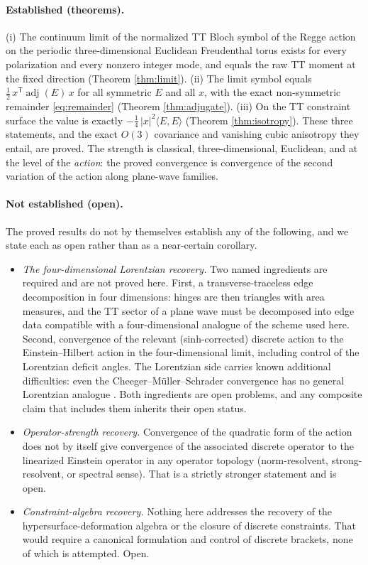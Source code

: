 \documentclass[11pt]{article}
\theoremstyle{definition}
\theoremstyle{remark}
\DeclareMathOperator{\adjE}{adj}
\newcommand{\trans}{\mathsf{T}}
\begin{document}
\paragraph{Established (theorems).}
(i) The continuum limit of the normalized TT Bloch symbol of the Regge action on the periodic three-dimensional Euclidean Freudenthal torus exists for every polarization and every nonzero integer mode, and equals the raw TT moment at the fixed direction (Theorem \ref{thm:limit}). (ii) The limit symbol equals $\tfrac12\,x^{\trans}\adjE(E)\,x$ for all symmetric $E$ and all $x$, with the exact non-symmetric remainder \eqref{eq:remainder} (Theorem \ref{thm:adjugate}). (iii) On the TT constraint surface the value is exactly $-\tfrac14\,|x|^2\langle E,E\rangle$ (Theorem \ref{thm:isotropy}). These three statements, and the exact $O(3)$ covariance and vanishing cubic anisotropy they entail, are proved. The strength is classical, three-dimensional, Euclidean, and at the level of the \emph{action}: the proved convergence is convergence of the second variation of the action along plane-wave families.

\paragraph{Not established (open).}
The proved results do not by themselves establish any of the following, and we state each as open rather than as a near-certain corollary.
\begin{itemize}
\item \emph{The four-dimensional Lorentzian recovery.} Two named ingredients are required and are not proved here. First, a transverse-traceless edge decomposition in four dimensions: hinges are then triangles with area measures, and the TT sector of a plane wave must be decomposed into edge data compatible with a four-dimensional analogue of the scheme used here. Second, convergence of the relevant (sinh-corrected) discrete action to the Einstein--Hilbert action in the four-dimensional limit, including control of the Lorentzian deficit angles. The Lorentzian side carries known additional difficulties: even the Cheeger--M\"uller--Schrader convergence has no general Lorentzian analogue \cite{CMS, Brewin}. Both ingredients are open problems, and any composite claim that includes them inherits their open status.
\item \emph{Operator-strength recovery.} Convergence of the quadratic form of the action does not by itself give convergence of the associated discrete operator to the linearized Einstein operator in any operator topology (norm-resolvent, strong-resolvent, or spectral sense). That is a strictly stronger statement and is open.
\item \emph{Constraint-algebra recovery.} Nothing here addresses the recovery of the hypersurface-deformation algebra or the closure of discrete constraints. That would require a canonical formulation and control of discrete brackets, none of which is attempted. Open.
\end{itemize}
\end{document}
